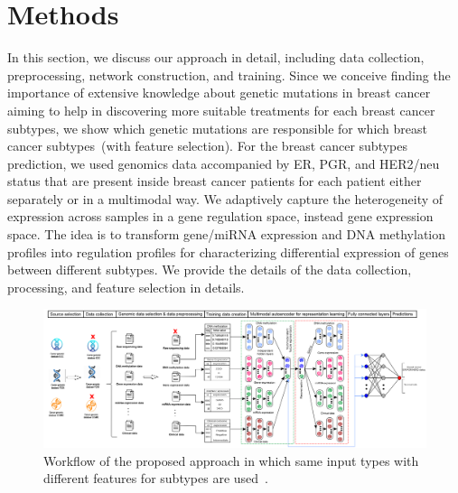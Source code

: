 \section{Methods}\label{chapter_4:mm}
In this section, we discuss our approach in detail, including data collection, preprocessing, network construction, and training. 
Since we conceive finding the importance of extensive knowledge about genetic mutations in breast cancer aiming to help in discovering more suitable treatments for each breast cancer subtypes, we show which genetic mutations are responsible for which breast cancer subtypes~(with feature selection). %
For the breast cancer subtypes prediction, we used genomics data accompanied by ER, PGR, and HER2/neu status that are present inside breast cancer patients for each patient either separately or in a multimodal way. 
We adaptively capture the heterogeneity of expression across samples in a gene regulation space, instead gene expression space. The idea is to  transform gene/miRNA expression and DNA methylation profiles into regulation profiles for characterizing differential expression of genes between different subtypes.
We provide the details of the data collection, processing, and feature selection in details. 

\begin{figure}
	\centering
	\includegraphics[width=\textwidth]{images/mae_v2.png}
	\caption{Workflow of the proposed approach in which same input types with different features for subtypes %
	are used~\cite{karimACCESS2019}.}
	\label{fig:wf_mae}
\end{figure}


